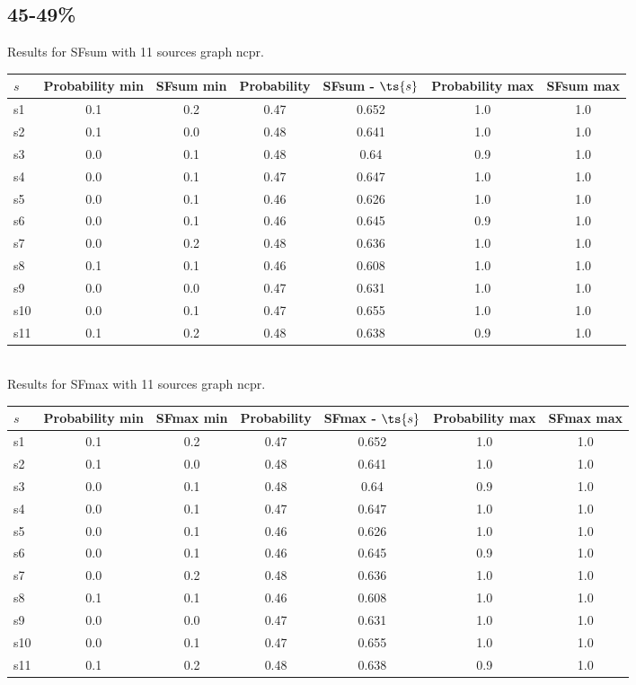 \documentclass{article}
\begin{document}
\newpage

\subsection{45-49\%}

\noindent Results for SFsum with 11 sources graph ncpr.

\noindent\begin{tabular}{|l|c|c|c|c|c|c|}
\hline
$s$& Probability min & SFsum min & Probability & SFsum - $\ts{s}$ & Probability max & SFsum max\\
\hline
s1 &0.1 & 0.2 & 0.47 & 0.652 & 1.0 & 1.0\\
\hline
s2 &0.1 & 0.0 & 0.48 & 0.641 & 1.0 & 1.0\\
\hline
s3 &0.0 & 0.1 & 0.48 & 0.64 & 0.9 & 1.0\\
\hline
s4 &0.0 & 0.1 & 0.47 & 0.647 & 1.0 & 1.0\\
\hline
s5 &0.0 & 0.1 & 0.46 & 0.626 & 1.0 & 1.0\\
\hline
s6 &0.0 & 0.1 & 0.46 & 0.645 & 0.9 & 1.0\\
\hline
s7 &0.0 & 0.2 & 0.48 & 0.636 & 1.0 & 1.0\\
\hline
s8 &0.1 & 0.1 & 0.46 & 0.608 & 1.0 & 1.0\\
\hline
s9 &0.0 & 0.0 & 0.47 & 0.631 & 1.0 & 1.0\\
\hline
s10 &0.0 & 0.1 & 0.47 & 0.655 & 1.0 & 1.0\\
\hline
s11 &0.1 & 0.2 & 0.48 & 0.638 & 0.9 & 1.0\\
\hline
\end{tabular}\\

\noindent Results for SFmax with 11 sources graph ncpr.

\noindent\begin{tabular}{|l|c|c|c|c|c|c|}
\hline
$s$& Probability min & SFmax min & Probability & SFmax - $\ts{s}$ & Probability max & SFmax max\\
\hline
s1 &0.1 & 0.2 & 0.47 & 0.652 & 1.0 & 1.0\\
\hline
s2 &0.1 & 0.0 & 0.48 & 0.641 & 1.0 & 1.0\\
\hline
s3 &0.0 & 0.1 & 0.48 & 0.64 & 0.9 & 1.0\\
\hline
s4 &0.0 & 0.1 & 0.47 & 0.647 & 1.0 & 1.0\\
\hline
s5 &0.0 & 0.1 & 0.46 & 0.626 & 1.0 & 1.0\\
\hline
s6 &0.0 & 0.1 & 0.46 & 0.645 & 0.9 & 1.0\\
\hline
s7 &0.0 & 0.2 & 0.48 & 0.636 & 1.0 & 1.0\\
\hline
s8 &0.1 & 0.1 & 0.46 & 0.608 & 1.0 & 1.0\\
\hline
s9 &0.0 & 0.0 & 0.47 & 0.631 & 1.0 & 1.0\\
\hline
s10 &0.0 & 0.1 & 0.47 & 0.655 & 1.0 & 1.0\\
\hline
s11 &0.1 & 0.2 & 0.48 & 0.638 & 0.9 & 1.0\\
\hline
\end{tabular}\\
\end{document}
